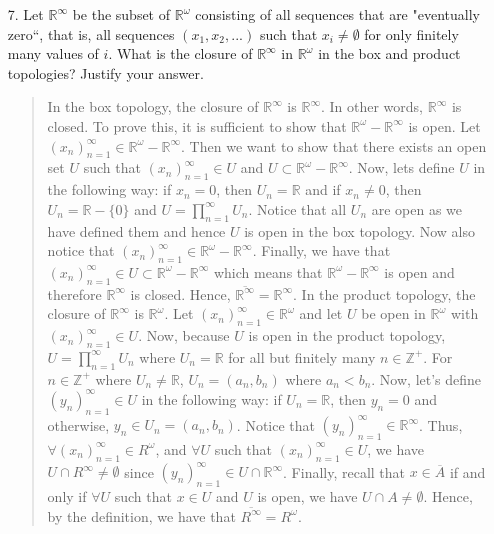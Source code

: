 \documentclass[12pt, a4paper]{article}
\newcommand{\pints}{\mathbb{Z}^+} %
\newcommand{\reals}{\mathbb{R}} %
\begin{document}
\begin{itemize}
\item[7.]
Let $\reals^\infty$ be the subset of $\reals^\omega$ consisting of all sequences that are "eventually zero``,
that is, all sequences $(x_1, x_2, ...)$ such that $x_i \neq \emptyset$ for only finitely many values
of $i$. What is the closure of $\reals^\infty$ in $\reals^\omega$ in the box and product topologies? Justify your answer.
\begin{quote}
In the box topology, the closure of $\reals^\infty$ is $\reals^\infty$. In other words,
$\reals^\infty$ is closed. To prove this, it is sufficient to show that
$\reals^\omega - \reals^\infty$ is open. Let $(x_n)_{n = 1}^\infty \in \reals^\omega - \reals^\infty$. Then
we want to show that there exists an open set $U$ such that $(x_n)_{n = 1}^\infty \in U$
and $U \subset \reals^\omega - \reals^\infty$. Now, lets define $U$ in the following way:
if $x_n = 0$, then $U_n = \reals$ and if $x_n \neq 0$, then $U_n = \reals - \{0\}$ and $U = \displaystyle\prod_{n = 1}^{\infty}U_n$.
Notice that all $U_n$ are open as we have defined them and hence $U$ is open in the box topology.
Now also notice that $(x_n)_{n = 1}^\infty \in \reals^\omega - \reals^\infty$. Finally,
we have that $(x_n)_{n = 1}^\infty \in U \subset \reals^\omega - \reals^\infty$ which means that
$\reals^\omega - \reals^\infty$ is open and therefore $\reals^\infty$ is closed. Hence, $\overline{\reals^\infty} = \reals^\infty$.
\newline
\newline
In the product topology, the closure of $\reals^\infty$ is $\reals^\omega$.
Let $(x_n)_{n = 1}^\infty \in \reals^\omega$ and let $U$ be open in $\reals^\omega$
with $(x_n)_{n = 1}^\infty \in U$. Now, because $U$ is open in the product topology,
$U = \displaystyle\prod_{n = 1}^\infty U_n$ where $U_n = \reals$ for all but finitely
many $n \in \pints$. For $n \in \pints$ where $U_n \neq \reals$, $U_n = (a_n, b_n)$
where $a_n < b_n$. Now, let's define $(y_n)_{n = 1}^\infty \in U$ in the following way:
\vspace{0.1cm}
if $U_n = \reals$, then $y_n = 0$ and otherwise, $y_n \in U_n = (a_n, b_n)$. Notice that
$(y_n)_{n = 1}^\infty \in \reals^\infty$. Thus, $\forall (x_n)_{n = 1}^\infty \in R^\omega$,
\vspace{0.1cm}
and $\forall U$ such that $(x_n)_{n = 1}^\infty \in U$, we have $U \cap R^\infty \neq \emptyset$
since $(y_n)_{n = 1}^\infty \in U \cap \reals^\infty$. Finally, recall that
$x \in \overline{A}$ if and only if $\forall U$ such that $x \in U$ and $U$ is open,
we have $U \cap A \neq \emptyset$. Hence, by the definition, we have that $\overline{R^\infty} = R^\omega$.
\end{quote}


\end{itemize}
\end{document}

